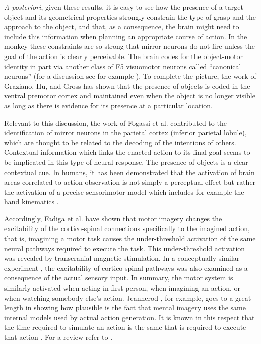 {\em A posteriori}, given these results, it is easy to see how the
presence of a target object and its geometrical properties strongly
constrain the type of grasp and the approach to the object, and that,
as a consequence, the brain might need to include this information
when planning an appropriate course of action. In the monkey these
constraints are so strong that mirror neurons do not fire unless the
goal of the action is clearly perceivable. The brain codes for the
object-motor identity in part via another class of F5 visuomotor
neurons called ``canonical neurons'' (for a discussion see for example
\cite{metta-06}). To complete the picture, the work of Graziano,
Hu, and Gross \cite{graziano-97} has shown that the presence of
objects is coded in the ventral premotor cortex and maintained even
when the object is no longer visible as long as there is evidence for
its presence at a particular location.

Relevant to this discussion, the work of Fogassi et
al. \cite{fogassi-05} contributed to the identification of mirror
neurons in the parietal cortex (inferior parietal lobule), which are
thought to be related to the decoding of the intentions of
others. Contextual information which links the enacted action to its
final goal seems to be implicated in this type of neural response. The
presence of objects is a clear contextual cue. In humans, it has been
demonstrated that the activation of brain areas correlated to action
observation is not simply a perceptual effect but rather the
activation of a precise sensorimotor model which includes for example
the hand kinematics
\cite{pozzo-06}.
 
Accordingly, Fadiga et al. \cite{fadiga-99,vargas-04} have shown that
motor imagery changes the excitability of the cortico-spinal
connections specifically to the imagined action, that is, imagining a
motor task causes the under-threshold activation of the same neural
pathways required to execute the task. This under-threshold activation
was revealed by transcranial magnetic stimulation. In a conceptually
similar experiment \cite{fadiga-05}, the excitability of
cortico-spinal pathways was also examined as a consequence of the
actual sensory input. In summary, the motor system is similarly
activated when acting in first person, when imagining an action, or
when watching somebody else's action. Jeannerod \cite{jeannerod-88},
for example, goes to a great length in showing how plausible is the
fact that mental imagery uses the same internal models used by actual
action generation.  It is known in this respect that the time required
to simulate an action is the same that is required to execute that
action \cite{sirigu-96}. For a review refer to \cite{jeannerod-99}.

